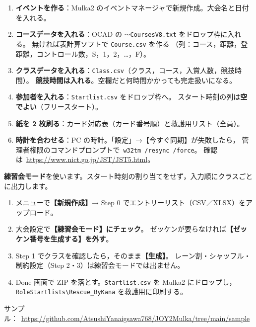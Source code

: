 \documentclass[a4paper,9pt]{ltjsarticle}
\begin{document}
\begin{enumerate}[leftmargin=*,itemsep=1pt]
\item \textbf{イベントを作る}：Mulka2 のイベントマネージャで新規作成。大会名と日付を入れる。
\item \textbf{コースデータを入れる}：OCAD の \texttt{〜CoursesV8.txt} をドロップ枠に入れる。
      無ければ表計算ソフトで \texttt{Course.csv} を作る
      （列：コース，距離，登距離，コントロール数，S，1，2，…，F）。
\item \textbf{クラスデータを入れる}：\texttt{Class.csv}（クラス，コース，入賞人数，競技時間）。
      \textbf{競技時間は入れる}。空欄だと何時間かかっても完走扱いになる。
\item \textbf{参加者を入れる}：\texttt{Startlist.csv} をドロップ枠へ。
      スタート時刻の列は\textbf{空でよい}（フリースタート）。
\item \textbf{紙を 2 枚刷る}：カード対応表（カード番号順）と救護用リスト（全員）。
\item \textbf{時計を合わせる}：PC の時計。「設定」→【今すぐ同期】が失敗したら，
      管理者権限のコマンドプロンプトで\ \texttt{w32tm /resync /force}。
      確認は\ \url{https://www.nict.go.jp/JST/JST5.html}。
\end{enumerate}

\begin{J2M}
\textbf{練習会モード}を使います。スタート時刻の割り当てをせず，入力順にクラスごとに出力します。

\begin{enumerate}[leftmargin=*,itemsep=0pt]
\item メニューで\textbf{【新規作成】}→ Step 0 でエントリーリスト（CSV／XLSX）をアップロード。
\item 大会設定で\textbf{【練習会モード】にチェック}。
      ゼッケンが要らなければ\textbf{【ゼッケン番号を生成する】を外す}。
\item Step 1 でクラスを確認したら，そのまま\textbf{【生成】}。
      レーン割・シャッフル・制約設定（Step 2・3）は練習会モードでは出ません。
\item Done 画面で ZIP を落とす。\texttt{Startlist.csv} を Mulka2 にドロップし，
      \texttt{RoleStartlists\textbackslash{}Rescue\_ByKana} を救護用に印刷する。
\end{enumerate}

サンプル：\ \url{https://github.com/AtsushiYanaigsawa768/JOY2Mulka/tree/main/sample}
\end{J2M}

\newpage
\end{document}
